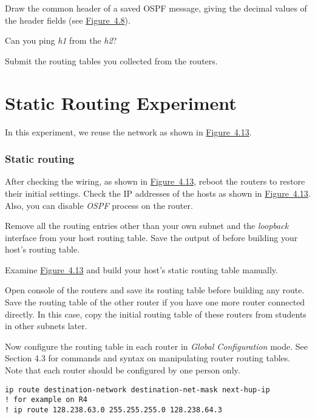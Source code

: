 \documentclass{../UTNetLab}
\begin{document}
    \begin{report}
        \item Draw the common header of a saved OSPF message, giving the decimal values of the header fields (see \hyperref[fig:4.8]{Figure~4.8}).
        
        \item Can you ping \textit{h1} from the \textit{h2}?
        
        \item Submit the routing tables you collected from the routers.
    \end{report}

\part{Static Routing Experiment}\label{sec:static}
    In this experiment, we reuse the network as shown in \hyperref[fig:4.13]{Figure~4.13}.
\section{Static routing}
    After checking the wiring, as shown in \hyperref[fig:4.13]{Figure~4.13}, reboot the routers to restore their initial settings.
    Check the IP addresses of the hosts as shown in \hyperref[fig:4.13]{Figure~4.13}.
    Also, you can disable \textit{OSPF} process on the router.

    Remove all the routing entries other than your own subnet and the \textit{loopback} interface from your host routing table.
    Save the output of  before building your host’s routing table.

    Examine \hyperref[fig:4.13]{Figure~4.13} and build your host’s static routing table manually.

    Open console of the routers and save its routing table before building any route.
    Save the routing table of the other router if you have one more router connected directly.
    In this case, copy the initial routing table of these routers from students in other subnets later.

    Now configure the routing table in each router in \textit{Global Configuration} mode.
    See Section 4.3 for commands and syntax on manipulating router routing tables.
    Note that each router should be configured by one person only.

    \begin{lstlisting}[language={cisco}, emph={destination-network, destination-net-mask, next-hup-ip}]
ip route destination-network destination-net-mask next-hup-ip
! for example on R4
! ip route 128.238.63.0 255.255.255.0 128.238.64.3
    \end{lstlisting}
\end{document}
